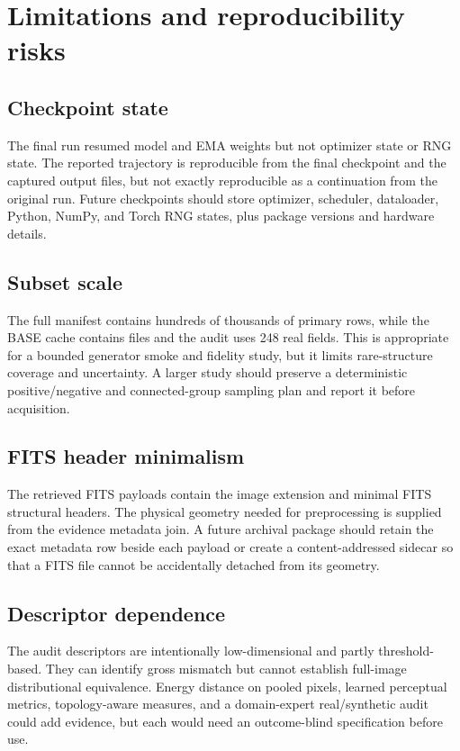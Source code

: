\documentclass[11pt,oneside]{report}
\begin{document}
\chapter{Limitations and reproducibility risks}

\section{Checkpoint state}

The final run resumed model and EMA weights but not optimizer state or RNG state. The reported trajectory is reproducible from the final checkpoint and the captured output files, but not exactly reproducible as a continuation from the original run. Future checkpoints should store optimizer, scheduler, dataloader, Python, NumPy, and Torch RNG states, plus package versions and hardware details.

\section{Subset scale}

The full manifest contains hundreds of thousands of primary rows, while the BASE cache contains \AcquiredCount{} files and the audit uses 248 real fields. This is appropriate for a bounded generator smoke and fidelity study, but it limits rare-structure coverage and uncertainty. A larger study should preserve a deterministic positive/negative and connected-group sampling plan and report it before acquisition.

\section{FITS header minimalism}

The retrieved FITS payloads contain the image extension and minimal FITS structural headers. The physical geometry needed for preprocessing is supplied from the evidence metadata join. A future archival package should retain the exact metadata row beside each payload or create a content-addressed sidecar so that a FITS file cannot be accidentally detached from its geometry.

\section{Descriptor dependence}

The audit descriptors are intentionally low-dimensional and partly threshold-based. They can identify gross mismatch but cannot establish full-image distributional equivalence. Energy distance on pooled pixels, learned perceptual metrics, topology-aware measures, and a domain-expert real/synthetic audit could add evidence, but each would need an outcome-blind specification before use.
\end{document}
